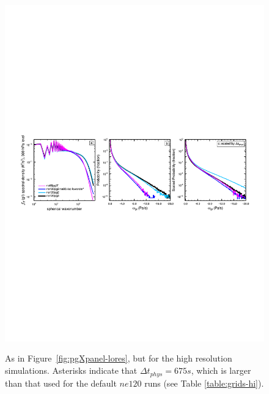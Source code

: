 \documentclass{agujournal}
\begin{document}
 \begin{figure}[t]
\begin{center}
\noindent\includegraphics[width=30pc,angle=0]{figs/panel_ne80pg3_ne120pg2_ne120pg3.pdf}\\
\end{center}
\caption{As in Figure~\ref{fig:pgXpanel-lores}, but for the high resolution simulations. Asterisks indicate that $\Delta t_{phys}=675 s$, which is larger than that used for the default $ne120$ runs (see Table \ref{table:grids-hi}). {\color{red}{why is there so many spaces around the equal sign?}}}
\label{fig:pgXpanel-hires}
\end{figure}
\end{document}
